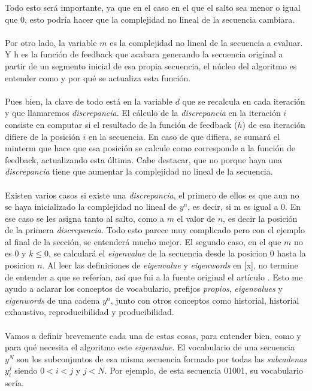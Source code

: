 Todo esto será importante, ya que en el caso en el que el salto sea menor o igual que 0, esto podría hacer que la complejidad no lineal de la secuencia cambiara.\\\\
Por otro lado, la variable $m$ es la complejidad no lineal de la secuencia a evaluar. Y h es la función de feedback que acabara generando la secuencia original a partir de un segmento inicial de esa propia secuencia, el núcleo del algoritmo es entender como y por qué se actualiza esta función.\\\\
Pues bien, la clave de todo está en la variable $d$ que se recalcula en cada iteración y que llamaremos \textit{discrepancia}. El cálculo de la \textit{discrepancia} en la iteración $i$ consiste en computar si el resultado de la función de feedback ($h$) de esa iteración difiere de la posición $i$ en la secuencia. En caso de que difiera, se sumará el minterm que hace que esa posición se calcule como corresponde a la función de feedback, actualizando esta última. Cabe destacar, que no porque haya una \textit{discrepancia} tiene que aumentar la complejidad no lineal de la secuencia.\\\\
Existen varios casos si existe una \textit{discrepancia}, el primero de ellos es que aun no se haya inicializado la complejidad no lineal de $y^{n}$, es decir, si m es igual a 0. En ese caso se les asigna tanto al salto, como a $m$ el valor de $n$, es decir la posición de la primera \textit{discrepancia}. Todo esto parece muy complicado pero con el ejemplo al final de la sección, se entenderá mucho mejor. El segundo caso, en el que $m$ no es 0 y $k \leq 0$, se calculará el \textit{eigenvalue} de la secuencia desde la posicion 0 hasta la posicion $n$. Al leer las definiciones de  \textit{eigenvalue} y \textit{eigenwords} en [x], no termine de entender a que se referían, así que fui a la fuente original el artículo \cite{lempel1976complexity}. Esto me ayudo a aclarar los conceptos de vocabulario, prefijos \textit{propios}, \textit{eigenvalues} y \textit{eigenwords} de una cadena $y^n$, junto con otros conceptos como historial, historial exhaustivo, reproducibilidad y producibilidad. \\\\
Vamos a definir brevemente cada una de estas cosas, para entender bien, como y para qué necesita el algoritmo este \textit{eigenvalue}. El vocabulario de una secuencia $y^{N}$ son los subconjuntos de esa misma secuencia formado por todas las \textit{subcadenas} $y_i^{j}$ siendo $0 < i < j$ y $j < N$. Por ejemplo, de esta secuencia 01001, su vocabulario sería.

